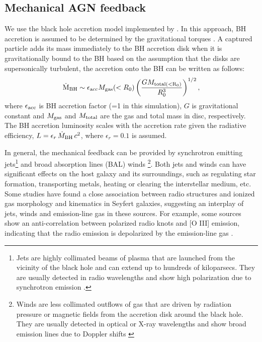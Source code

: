 \documentclass[fleqn,usenatbib]{mnras}
\begin{document}
\subsection{Mechanical AGN feedback} \label{sec:AGN}

We use the black hole accretion model implemented by \citet{Hopkins2011}. In this approach, BH accretion is assumed to be determined by the gravitational torques 
\citep[see][for more details of accretion methods]{Hopkins2016}.
A captured particle adds its mass immediately to the BH accretion disk when it is gravitationally bound to the BH based on the assumption that the disks are supersonically turbulent, the accretion onto the BH can be written as follows: 
\begin{equation}
   \dot{\rm M}_{\rm BH} \sim \epsilon_{\rm acc} M_{\rm gas}(<R_0) \left( \frac{G M_{\rm total(<R_0)}}{R^3_0}\right)^{1/2},
\end{equation}
where $\epsilon_{\rm acc}$ is BH accretion factor (=1 in this simulation), $G$
is gravitational constant and $M_{\rm gas}$ and $M_{\rm total}$ are the gas and total mass in disc, respectively. 
The BH accretion luminosity scales with the accretion rate given the radiative efficiency, $L=\epsilon_{r}\,\dot{M}_{\rm BH}\,c^{2}$, where $\epsilon_{r}=0.1$ is assumed.  

In general, the mechanical feedback can be provided by synchrotron emitting jets\footnote{Jets are highly collimated beams of plasma that are launched from the vicinity of the black hole and can extend up to hundreds of kiloparsecs. They are usually detected in radio wavelengths and show high polarization due to synchrotron emission \citep{Silpa2022}.} and broad absorption lines (BAL) winds \footnote{Winds are less collimated outflows of gas that are driven by radiation pressure or magnetic fields from the accretion disk around the black hole. They are usually detected in optical or X-ray wavelengths and show broad emission lines due to Doppler shifts \citep{Silpa2022}}. Both jets and winds can have significant effects on the host galaxy and its surroundings, such as regulating star formation, transporting metals, heating or clearing the interstellar medium, etc.
Some studies have found a close association between radio structures and ionized gas morphology and kinematics in Seyfert galaxies, suggesting an interplay of jets, winds and emission-line gas in these sources. For example, some sources show an anti-correlation between polarized radio knots and [O III] emission, indicating that the radio emission is depolarized by the emission-line gas \citep[see e.g  Mrk 231, XID 2028 in][respectively]{Silpa2021,Cresci2023}.
\end{document}
